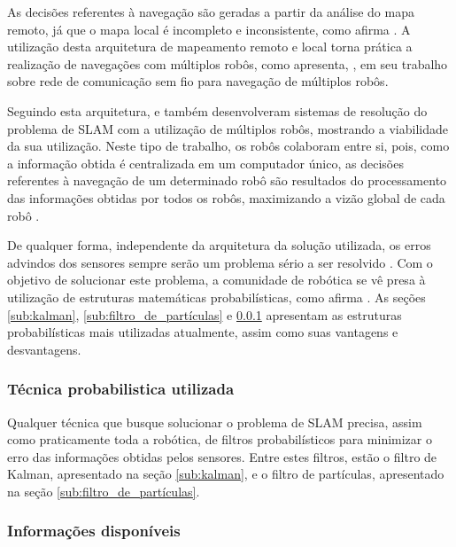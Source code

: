 			As decisões referentes à navegação são geradas a partir da análise do mapa remoto, já que o mapa local é incompleto e inconsistente, como afirma \cite{redeComunicacaoIndustria}. A utilização desta arquitetura de mapeamento remoto e local torna prática a realização de navegações com múltiplos robôs, como apresenta, \cite{redeComunicacaoIndustria}, em seu trabalho sobre rede de comunicação sem fio para navegação de múltiplos robôs. 

			Seguindo esta arquitetura, \cite{neuralNetwork} e \cite{multiRobots} também desenvolveram sistemas de resolução do problema de SLAM com a utilização de múltiplos robôs, mostrando a viabilidade da sua utilização. Neste tipo de trabalho, os robôs colaboram entre si, pois, como a informação obtida é centralizada em um computador único, as decisões referentes à navegação de um determinado robô são resultados do processamento das informações obtidas por todos os robôs, maximizando a vizão global de cada robô \cite{redeComunicacaoIndustria}.

			De qualquer forma, independente da arquitetura da solução utilizada, os erros advindos dos sensores sempre serão um problema sério a ser resolvido \cite{circumventingAssociationSLAM}. Com o objetivo de solucionar este problema, a comunidade de robótica se vê presa à utilização de estruturas matemáticas probabilísticas, como afirma \cite{circumventingAssociationSLAM}. As seções \ref{sub:kalman}, \ref{sub:filtro_de_partículas} e \ref{sub:prob_usada} apresentam as estruturas probabilísticas mais utilizadas atualmente, assim como suas vantagens e desvantagens.

		\subsubsection{Técnica probabilistica utilizada}
		\label{sub:prob_usada}

			

			Qualquer técnica que busque solucionar o problema de SLAM precisa, assim como praticamente toda a robótica, de filtros probabilísticos para minimizar o erro das informações obtidas pelos sensores. Entre estes filtros, estão o filtro de Kalman, apresentado na seção \ref{sub:kalman}, e o filtro de partículas, apresentado na seção \ref{sub:filtro_de_partículas}. 

		\subsubsection{Informações disponíveis}
		\label{sub:infos_disponiveis}

